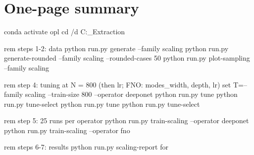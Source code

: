 \documentclass[11pt,a4paper]{article}
\begin{document}
\section{One-page summary}

\begin{cmd}
conda activate opl
cd /d C:\PhD\Feature_Extraction

rem  steps 1-2: data
python run.py generate --family scaling
python run.py generate-rounded --family scaling --rounded-cases 50
python run.py plot-sampling --family scaling

rem  step 4: tuning at N = 800 (then lr; FNO: modes_width, depth, lr)
set T=--family scaling --train-size 800 --operator deeponet
python run.py tune        %
python run.py tune-select %
python run.py tune        %
python run.py tune-select %

rem  step 5: 25 runs per operator
python run.py train-scaling --operator deeponet
python run.py train-scaling --operator fno

rem  steps 6-7: results
python run.py scaling-report
for %
\end{cmd}

\end{document}
